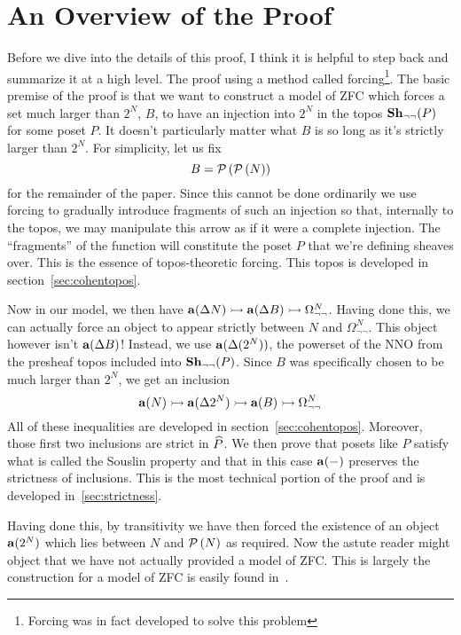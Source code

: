 \section{An Overview of the Proof}\label{sec:overview}
Before we dive into the details of this proof, I think it is helpful
to step back and summarize it at a high level. The proof using a
method called forcing\footnote{Forcing was in fact developed to solve
  this problem}. The basic premise of the proof is that we want to
construct a model of ZFC which forces a set much larger than $2^{N}$,
$B$, to have an injection into $2^{N}$ in the topos
$\sheaves[\neg\neg]{P}$ for some poset $P$. It doesn't particularly
matter what $B$ is so long as it's strictly larger than $2^N$. For
simplicity, let us fix
\[
  B = \pow{\pow{N}}
\]
for the remainder of the paper. Since this cannot be done ordinarily
we use forcing to gradually introduce fragments of such an injection
so that, internally to the topos, we may manipulate this arrow as if
it were a complete injection. The ``fragments'' of the function will
constitute the poset $P$ that we're defining sheaves over. This is the
essence of topos-theoretic forcing. This topos is developed in
section~\ref{sec:cohentopos}.

Now in our model, we then have
$\sheafify(\Delta N) \mono \sheafify(\Delta B) \mono \Omega_{\neg\neg}^N$.
Having done this, we can actually force an object to appear strictly
between $N$ and $\Omega_{\neg\neg}^N$. This object however isn't
$\sheafify(\Delta B)$!  Instead, we use $\sheafify(\Delta(2^N))$, the
powerset of the NNO from the presheaf topos included into
$\sheaves[\neg\neg]{P}$. Since $B$ was specifically chosen to be much
larger than $2^N$, we get an inclusion
\[
  \sheafify(N) \mono \sheafify(\Delta 2^N) \mono \sheafify(B) \mono \Omega_{\neg\neg}^N
\]
All of these inequalities are developed in
section~\ref{sec:cohentopos}. Moreover, those first two
inclusions are strict in $\presheaf{P}$. We then prove that posets
like $P$ satisfy what is called the Souslin property and that in this
case $\sheafify(-)$ preserves the strictness of inclusions. This is
the most technical portion of the proof and is developed
in~\ref{sec:strictness}.

Having done this, by transitivity we have then forced the existence of
an object $\sheafify(2^N)$ which lies between $N$ and $\pow{N}$ as
required. Now the astute reader might object that we have not actually
provided a model of ZFC. This is largely the construction for a model
of ZFC is easily found in~\citet{Fourman:80}.
